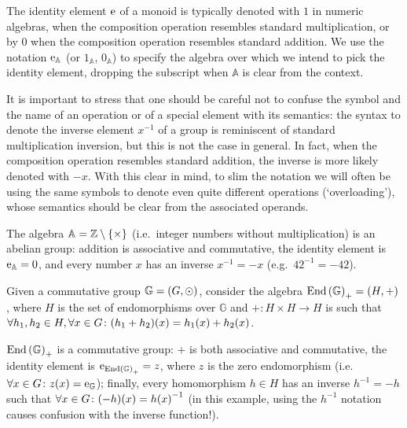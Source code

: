 The identity element \(\mathrm{e} \) of a monoid is typically denoted with \(1\) in 
numeric algebras, when the composition operation resembles standard multiplication, or by \(0\) 
when the composition operation resembles standard addition. 
We use the notation \(\mathrm{e}_{\mathbb{A}}\) (or \(1_{\mathbb{A}}\), 
\(0_{\mathbb{A}}\)) to specify the algebra over which we intend to pick the identity element, 
dropping the subscript when \(\mathbb{A}\) is clear from the context.

It is important to stress that one should be careful not to confuse the symbol and the name of an 
operation or of a special element with its semantics: the syntax to denote the inverse element 
\(x^{-1}\) of a group is reminiscent of standard multiplication inversion, but this is not the 
case in general.
In fact, when the composition operation resembles standard addition, the inverse is more likely 
denoted with \(-x\).
With this clear in mind, to slim the notation we will often be using the same symbols to denote 
even quite different operations (`overloading'), whose semantics should be clear from the 
associated operands. 
\begin{example}
  The algebra \(\mathbb{A} = \mathbb{Z} \setminus \left\{\times\right\}\) (i.e.\ integer numbers 
  without multiplication) is an abelian group: 
  addition is associative and commutative, the identity element is 
  \(\mathrm{e}_{\mathbb{A}} = 0\), and every number \(x\) has an inverse \(x^{-1} = -x\) 
  (e.g.\  \({42}^{-1} = -42\)). 
\end{example}

\begin{example}\label{ex:endo_group}
  Given a commutative group \(\mathbb{G} = \left(G, \odot\right)\), consider the algebra 
  \(\mathrm{End}\left(\mathbb{G}\right)_{+} = \left(H, +\right)\), where \(H\) is the set of endomorphisms over 
  \(\mathbb{G}\) and \(+\colon H \times H \to H\) is such that 
  \(\forall h_1, h_2 \in H, \forall x \in G\colon \call{\Parens*{h_1 + h_2}}{x} = 
  \call{h_1}{x} + \call{h_2}{x}\).

  \(\mathrm{End}\left(\mathbb{G}\right)_{+}\) is a commutative group: \(+\) is both associative and 
  commutative, the identity element is \(\mathrm{e}_{\mathrm{End}\left(\mathbb{G}\right)_{+}} = z\), where
  \(z\) is the zero endomorphism (i.e.\  \(\forall x \in G\colon \call{z}{x} = 
  \algid_{\mathbb{G}}\)); finally, every homomorphism \(h \in H\) has an inverse 
  \(h^{-1} = -h\) such that \(\forall x \in G\colon \call{\Parens*{-h}}{x} = 
  \call{h}{x}^{-1}\) (in this example, using the \(h^{-1}\) notation causes confusion with 
  the inverse function!).
\end{example}

